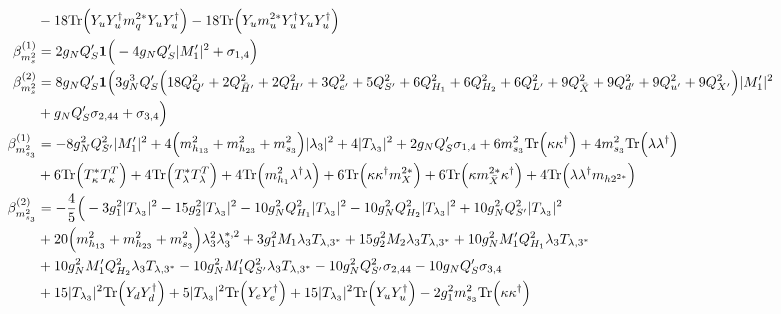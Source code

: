 {\begin{align}
 &-18 \mbox{Tr}\Big({Y_u  Y_{u}^{\dagger}  m_q^{2 *}  Y_u  Y_{u}^{\dagger}}\Big) -18 \mbox{Tr}\Big({Y_u  m_u^{2 *}  Y_{u}^{\dagger}  Y_u  Y_{u}^{\dagger}}\Big) \\ 
\beta_{m_{s}^2}^{(1)} & =  
2 g_N Q_S' {\bf 1} \Big(-4 g_N Q_S' |M_1'|^2  + \sigma_{1,4}\Big)\\ 
\beta_{m_{s}^2}^{(2)} & =  
8 g_N Q_S' {\bf 1} \Big(3 g_{N}^{3} Q_S' \Big(18 Q_{Q'}^{2}  + 2 Q_{\bar{H}'}^{2}  + 2 Q_{H'}^{2}  + 3 Q_{e'}^{2}  + 5 Q_{S'}^{2}  + 6 Q_{H_1}^{2}  + 6 Q_{H_2}^{2}  + 6 Q_{L'}^{2}  + 9 Q_{\bar{X}}^{2}  + 9 Q_{d'}^{2}  + 9 Q_{u'}^{2}  + 9 Q_{X'}^{2} \Big)|M_1'|^2 \nonumber \\ 
 &+g_N Q_S' \sigma_{2,44} +\sigma_{3,4}\Big)\\ 
\beta_{m_{s_3}^2}^{(1)} & =  
-8 g_{N}^{2} Q_{S'}^{2} |M_1'|^2 +4 \Big(m_{h_{13}}^2 + m_{h_{23}}^2 + m_{s_3}^2\Big)|\lambda_3|^2 +4 |T_{\lambda_3}|^2 +2 g_N Q_S' \sigma_{1,4} +6 m_{s_3}^2 \mbox{Tr}\Big({\kappa  \kappa^{\dagger}}\Big) +4 m_{s_3}^2 \mbox{Tr}\Big({\lambda  \lambda^{\dagger}}\Big) \nonumber \\ 
 &+6 \mbox{Tr}\Big({T_{\kappa}^*  T_{\kappa}^{T}}\Big) +4 \mbox{Tr}\Big({T_{\lambda}^*  T_{\lambda}^{T}}\Big) +4 \mbox{Tr}\Big({m_{h_1}^2  \lambda^{\dagger}  \lambda}\Big) +6 \mbox{Tr}\Big({\kappa  \kappa^{\dagger}  m_{X}^{2 *}}\Big) +6 \mbox{Tr}\Big({\kappa  m_{\bar{X}}^{2 *}  \kappa^{\dagger}}\Big) +4 \mbox{Tr}\Big({\lambda  \lambda^{\dagger}  m_{{h 2}^{2 *}}}\Big) \\ 
\beta_{m_{s_3}^2}^{(2)} & =  
-\frac{4}{5} \Big(-3 g_{1}^{2} |T_{\lambda_3}|^2 -15 g_{2}^{2} |T_{\lambda_3}|^2 -10 g_{N}^{2} Q_{H_1}^{2} |T_{\lambda_3}|^2 -10 g_{N}^{2} Q_{H_2}^{2} |T_{\lambda_3}|^2 +10 g_{N}^{2} Q_{S'}^{2} |T_{\lambda_3}|^2 \nonumber \\ 
 &+20 \Big(m_{h_{13}}^2 + m_{h_{23}}^2 + m_{s_3}^2\Big)\lambda_{3}^{2} \lambda_{3}^{*,2} +3 g_{1}^{2} M_1 \lambda_3 T_{{\lambda,3}^*} +15 g_{2}^{2} M_2 \lambda_3 T_{{\lambda,3}^*} +10 g_{N}^{2} M_1' Q_{H_1}^{2} \lambda_3 T_{{\lambda,3}^*} \nonumber \\ 
 &+10 g_{N}^{2} M_1' Q_{H_2}^{2} \lambda_3 T_{{\lambda,3}^*} -10 g_{N}^{2} M_1' Q_{S'}^{2} \lambda_3 T_{{\lambda,3}^*} -10 g_{N}^{2} Q_{S'}^{2} \sigma_{2,44} -10 g_N Q_S' \sigma_{3,4} \nonumber \\ 
 &+15 |T_{\lambda_3}|^2 \mbox{Tr}\Big({Y_d  Y_{d}^{\dagger}}\Big) +5 |T_{\lambda_3}|^2 \mbox{Tr}\Big({Y_e  Y_{e}^{\dagger}}\Big) +15 |T_{\lambda_3}|^2 \mbox{Tr}\Big({Y_u  Y_{u}^{\dagger}}\Big) -2 g_{1}^{2} m_{s_3}^2 \mbox{Tr}\Big({\kappa  \kappa^{\dagger}}\Big) \nonumber \\ 

\end{align}}
